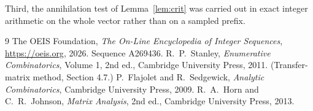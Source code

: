 \documentclass[11pt,a4paper]{article}
\theoremstyle{plain}
\theoremstyle{definition}
\begin{document}
Third, the annihilation test of Lemma~\ref{lem:crit} was carried out in exact integer
arithmetic on the whole vector rather than on a sampled prefix.

\begin{thebibliography}{9}
 The OEIS Foundation, \emph{The On-Line Encyclopedia of Integer
Sequences}, \url{https://oeis.org}, 2026. Sequence A269436.
 R.~P.~Stanley, \emph{Enumerative Combinatorics}, Volume 1, 2nd ed.,
Cambridge University Press, 2011. (Transfer-matrix method, Section 4.7.)
 P.~Flajolet and R.~Sedgewick, \emph{Analytic Combinatorics}, Cambridge
University Press, 2009.
 R.~A.~Horn and C.~R.~Johnson, \emph{Matrix Analysis}, 2nd ed., Cambridge
University Press, 2013.
\end{thebibliography}
\end{document}
